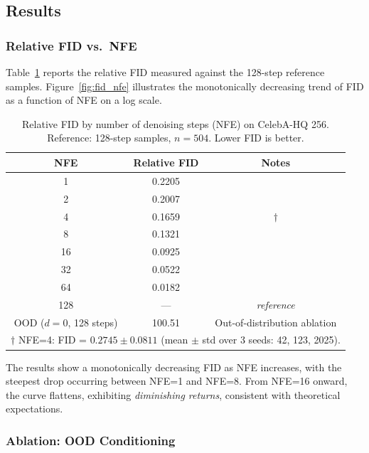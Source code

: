 \subsection{Results}
\label{sec:results}

\subsubsection{Relative FID vs.\ NFE}

Table~\ref{tab:fid_relative} reports the relative FID measured against the
128-step reference samples.
Figure~\ref{fig:fid_nfe} illustrates the monotonically decreasing trend of FID
as a function of NFE on a log scale.

\begin{table}[h]
\centering
\caption{Relative FID by number of denoising steps (NFE) on CelebA-HQ 256.
Reference: 128-step samples, $n=504$. Lower FID is better.}
\label{tab:fid_relative}
\begin{tabular}{ccc}
\toprule
\textbf{NFE} & \textbf{Relative FID} & \textbf{Notes} \\
\midrule
1   & 0.2205 & \\
2   & 0.2007 & \\
4   & 0.1659 & $\dagger$ \\
8   & 0.1321 & \\
16  & 0.0925 & \\
32  & 0.0522 & \\
64  & 0.0182 & \\
128 & ---    & \textit{reference} \\
\midrule
OOD ($d=0$, 128 steps) & 100.51 & Out-of-distribution ablation \\
\bottomrule
\multicolumn{3}{l}{\footnotesize $\dagger$ NFE=4: FID = $0.2745 \pm 0.0811$
  (mean $\pm$ std over 3 seeds: 42, 123, 2025).}
\end{tabular}
\end{table}

\noindent The results show a monotonically decreasing FID as NFE increases,
with the steepest drop occurring between NFE=1 and NFE=8.
From NFE=16 onward, the curve flattens, exhibiting \textit{diminishing
returns}, consistent with theoretical expectations.

\subsubsection{Ablation: OOD Conditioning}

